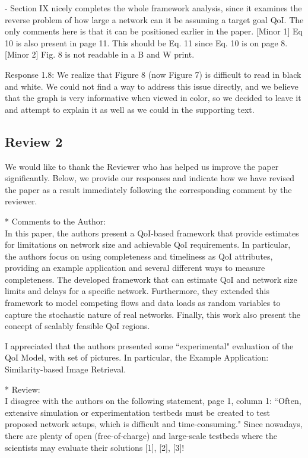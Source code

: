 \documentclass[12pt, letterpaper, onecolumn]{IEEEtran}
\begin{document}
- Section IX nicely completes the whole framework analysis, since it examines the reverse problem of how large a network can it be assuming a target goal QoI. The only comments here is that it can be positioned earlier in the paper. [Minor 1] Eq 10 is also present in page 11. This should be Eq. 11 since Eq. 10 is on page 8. [Minor 2] Fig. 8 is not readable in a B and W print. 

{\color {blue}
Response 1.8: We realize that Figure 8 (now Figure 7) is difficult to read in black and white. We could not find a way to address this issue directly, and we believe that the graph is very informative when viewed in color, so we decided to leave it and attempt to explain it as well as we could in the supporting text.
}


\newpage
\subsection{Review 2 }
{ \color {blue}We would like to thank the Reviewer who has helped us improve the paper significantly. Below, we provide our responses and indicate how we have revised the paper as a result immediately following the corresponding comment by the reviewer.}

\noindent** Comments to the Author: \\
In this paper, the authors present a QoI-based framework that provide estimates for limitations on network size and achievable QoI requirements. In particular, the authors focus on using completeness and timeliness as QoI attributes, providing an example application and several different ways to measure completeness. The developed framework that can estimate QoI and network size limits and delays for a specific network. Furthermore, they extended this framework to model competing flows and data loads as random variables to capture the stochastic nature of real networks. Finally, this work also present the concept of scalably feasible QoI regions.

I appreciated that the authors presented some ``experimental" evaluation of the QoI Model, with set of pictures. In particular, the Example Application: Similarity-based Image Retrieval.

\noindent** Review: \\
I disagree with the authors on the following statement, page 1, column 1: ``Often, extensive simulation or experimentation testbeds must be created to test proposed network setups, which is difficult and time-consuming." Since nowadays, there are plenty of open (free-of-charge) and large-scale testbeds where the scientists may evaluate their solutions [1], [2], [3]! 
\end{document}
